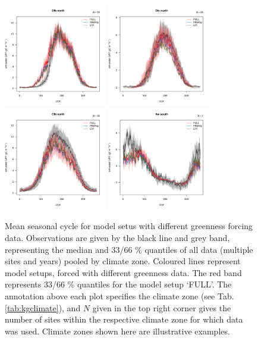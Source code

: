 \documentclass{myreport}
\begin{document}
 \begin{figure}[!ht]
    \centering
\includegraphics[width=0.4\textwidth]{fig/meandoy_byzone_Dfb_north_greenness.pdf}
\includegraphics[width=0.4\textwidth]{fig/meandoy_byzone_Dfc_north_greenness.pdf}\\
\includegraphics[width=0.4\textwidth]{fig/meandoy_byzone_Cfb_north_greenness.pdf}
\includegraphics[width=0.4\textwidth]{fig/meandoy_byzone_Aw_south_greenness.pdf}
    \caption{Mean seasonal cycle for model setus with different greenness forcing data. Observations are given by the black line and grey band, representing the median and 33/66 \% quantiles of all data (multiple sites and years) pooled by climate zone. Coloured lines represent model setups, forced with different greenness data. The red band represents 33/66 \% quantiles for the model setup `FULL'. The annotation above each plot specifies the climate zone (see Tab. \ref{tab:kgclimate}), and $N$ given in the top right corner gives the number of sites within the respective climate zone for which data was used. Climate zones shown here are illustrative examples.}
    \label{fig:season_greenness}
\end{figure}
\end{document}
